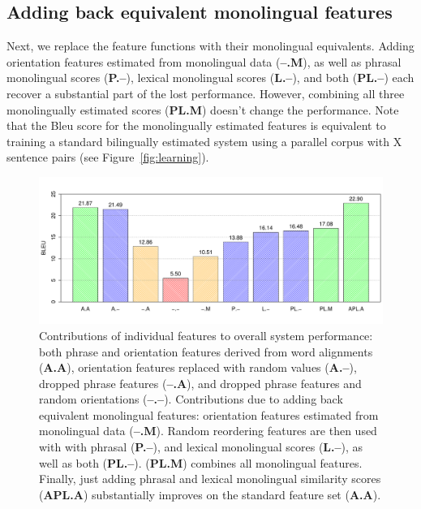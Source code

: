 \documentclass[11pt]{article}
\newcommand{\mnote}[1]{\marginpar{%
  \vskip-\baselineskip
  \raggedright\footnotesize
  \itshape\hrule\smallskip\tiny{#1}\par\smallskip\hrule}}
\newcommand{\mtodo}[1]{\mnote{\textcolor{red}{#1}}}
\newcommand{\figref}[1]{Figure~\ref{#1}}
\begin{document}
\subsection{Adding back equivalent monolingual features} \label{sect:exp:replacement}

Next, we replace the feature functions with their monolingual equivalents.  Adding orientation features estimated from monolingual data ({\bf --.M}), as well as phrasal monolingual scores ({\bf P.--}), lexical monolingual scores ({\bf L.--}), and both ({\bf PL.--}) each recover a substantial part of the lost performance.  However, combining all three monolingually estimated scores ({\bf PL.M}) doesn't change the performance. \mtodo{Fix here and in legend when new results are in.}  Note that the Bleu  score for the monolingually estimated features is equivalent to training a standard bilingually estimated system using a parallel corpus with X sentence pairs (see \figref{fig:learning}).  \mtodo{Fill in from learning curve.}

\begin{figure}[t]
\begin{center}
\includegraphics[width=\linewidth]{../figures/lesionreplacement/lesionreplacement.pdf}
\caption{Contributions of individual features to overall system performance: both phrase and orientation features derived from word alignments ({\bf A.A}), orientation features replaced with random values ({\bf A.--}), dropped phrase features ({\bf --.A}), and dropped phrase features and random orientations ({\bf --.--}).  Contributions due to adding back equivalent monolingual features: orientation features estimated from monolingual data ({\bf --.M}).  Random reordering features are then used with with phrasal ({\bf P.--}), and lexical monolingual scores ({\bf L.--}), as well as both ({\bf PL.--}).  ({\bf PL.M}) combines all monolingual features.  Finally, just adding phrasal and lexical monolingual similarity scores ({\bf APL.A}) substantially improves on the standard feature set ({\bf A.A}).}
\label{fig:lesionreplacement}
\end{center}
\vskip -0.2in
\end{figure}
\end{document}
